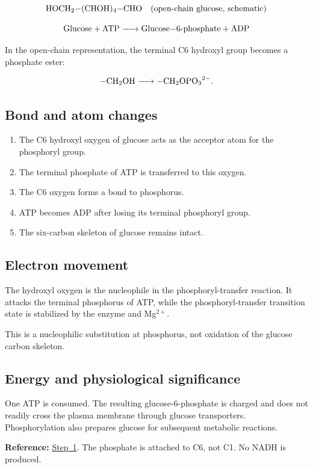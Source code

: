 \documentclass[11pt,a4paper]{article}
\newcommand{\stepref}[1]{\hyperref[step:#1]{Step~#1}}
\newcommand{\Note}[1]{\par\smallskip
  \noindent\colorbox{gray!12}{
    \parbox{0.96\linewidth}{#1}
  }\par\smallskip}
\begin{document}
\[
\ce{HOCH2-(CHOH)4-CHO}
\quad \text{(open-chain glucose, schematic)}
\]

\[
\ce{Glucose + ATP -> Glucose-6-phosphate + ADP}
\]

In the open-chain representation, the terminal C6 hydroxyl group
becomes a phosphate ester:

\[
\ce{-CH2OH -> -CH2OPO3^{2-}}.
\]

\subsection{Bond and atom changes}

\begin{enumerate}
  \item The C6 hydroxyl oxygen of glucose acts as the acceptor atom
  for the phosphoryl group.
  \item The terminal phosphate of ATP is transferred to this oxygen.
  \item The C6 oxygen forms a bond to phosphorus.
  \item ATP becomes ADP after losing its terminal phosphoryl group.
  \item The six-carbon skeleton of glucose remains intact.
\end{enumerate}

\subsection{Electron movement}

The hydroxyl oxygen is the nucleophile in the phosphoryl-transfer
reaction. It attacks the terminal phosphorus of ATP, while the
phosphoryl-transfer transition state is stabilized by the enzyme
and Mg$^{2+}$.

This is a nucleophilic substitution at phosphorus, not oxidation of
the glucose carbon skeleton.

\subsection{Energy and physiological significance}

One ATP is consumed. The resulting glucose-6-phosphate is charged
and does not readily cross the plasma membrane through glucose
transporters. Phosphorylation also prepares glucose for subsequent
metabolic reactions.

\Note{
\textbf{Reference:} \stepref{1}. The phosphate is attached to C6,
not C1. No NADH is produced.
}
\end{document}
